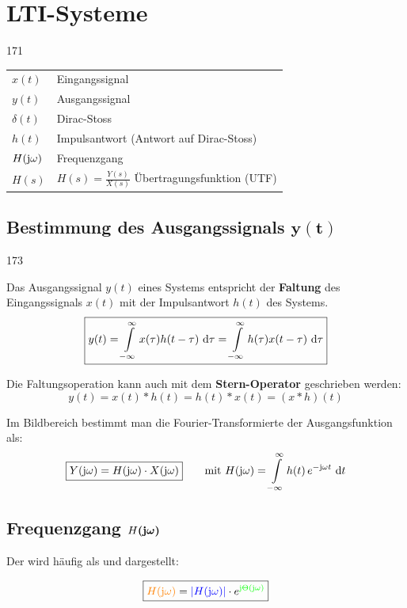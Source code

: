 \section{LTI-Systeme}{171}

\begin{tabular}{ll}
	$x(t)$ 				& Eingangssignal 										\\
	$y(t)$ 				& Ausgangssignal 										\\
	$\delta(t)$ 		& Dirac-Stoss 											\\
	$h(t)$ 				& Impulsantwort (Antwort auf Dirac-Stoss) 				\\
	$H(\mathrm{j} \omega)$ 	& Frequenzgang 											\\
	$H(s)$ 				& $H(s) = \frac{Y(s)}{X(s)}$ Übertragungsfunktion (UTF)
\end{tabular}


\subsection[Bestimmung des Ausgangssignals]{Bestimmung des Ausgangssignals $\bm{y(t)}$}{173}

Das Ausgangssignal $y(t)$ eines Systems entspricht der \textbf{Faltung} des Eingangssignals $x(t)$ mit der Impulsantwort $h(t)$ des Systems.
$$ \boxed{ y(t) = \int\limits_{-\infty}^{\infty} x(\tau) h(t-\tau) \, \mathop{} \! \mathrm{d} \tau = \int\limits_{-\infty}^{\infty} h(\tau) x(t-\tau) \, \mathop{} \! \mathrm{d} \tau } $$

Die Faltungsoperation kann auch mit dem \textbf{Stern-Operator} geschrieben werden:
$$ \boxed{ y(t) = x(t) * h(t) = h(t) * x(t) = (x * h)(t) } $$

\vspace{0.2cm}

Im Bildbereich bestimmt man die Fourier-Transformierte der Ausgangsfunktion als:
$$ \boxed{ Y(\mathrm{j} \omega) = H(\mathrm{j} \omega) \cdot X(\mathrm{j} \omega) } \qquad \text{mit } H(\mathrm{j} \omega) = \int\limits_{- \infty}^{\infty} h(t) \, e^{- \mathrm{j} \omega t} \, \mathop{} \! \mathrm{d} t $$


\subsection[Frequenzgang]{Frequenzgang $H\bm{(\mathrm{j} \omega)}$}
\label{Frequenzgang}

Der  wird häufig als  und  dargestellt:

$$ \boxed{ {\color{orange}H(\mathrm{j} \omega)} = {\color{blue}|H(\mathrm{j} \omega)|} \cdot e^{{\color{green}\mathrm{j} \Theta (\mathrm{j} \omega)} } }$$

